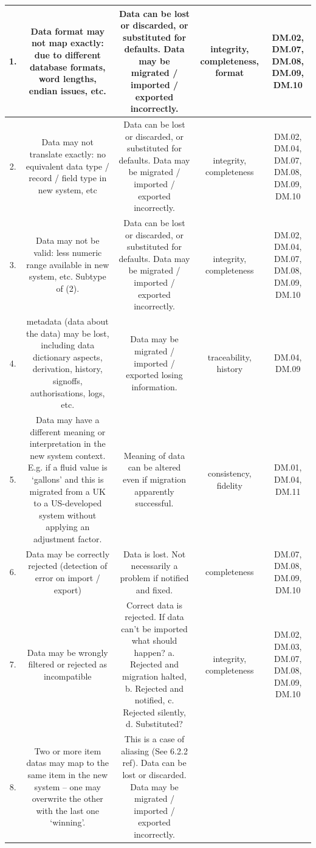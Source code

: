 \begin{longtable}{|C{}|C{}|C{}|C{}|C{}|}
1.&
Data format may not map exactly: due to different \gls{database} formats, word lengths, endian issues, etc.&
Data can be lost or discarded, or substituted for defaults. Data may be migrated / imported / exported incorrectly.&
\Gls{integrity}, \gls{completeness}, \gls{format}&
DM.02, DM.07, DM.08, DM.09, DM.10\\\hline
%
2.&
Data may not translate exactly: no equivalent data type / record / field type in new system, etc&
Data can be lost or discarded, or substituted for defaults. Data may be migrated / imported / exported incorrectly.&
\Gls{integrity}, \gls{completeness}&
DM.02, DM.04, DM.07, DM.08, DM.09, DM.10\\\hline
%
3.&
Data may not be valid: less numeric range available in new system, etc. Subtype of (2).&
Data can be lost or discarded, or substituted for defaults. Data may be migrated / imported / exported incorrectly.&
\Gls{integrity}, \gls{completeness}&
DM.02, DM.04, DM.07, DM.08, DM.09, DM.10\\\hline
%
4.&
\Gls{metadata} (data about the data) may be lost, including \gls{data dictionary} aspects, derivation, history, signoffs, authorisations,
logs, etc.&
Data may be migrated / imported / exported losing \gls{information}.&
\Gls{traceability}, \gls{history}&
DM.04, DM.09\\\hline
%
5.&
Data may have a different meaning or interpretation in the new system context.
E.g. if a fluid value is ‘gallons’ and this is migrated from a UK to a US-developed system without applying an adjustment factor.&
Meaning of data can be altered even if migration apparently successful.&
\Gls{consistency}, \gls{fidelity}&
DM.01, DM.04, DM.11\\\hline
%
6.
&
Data may be correctly rejected (detection of error on import / export)&
Data is lost. Not necessarily a problem if notified and fixed.&
\Gls{completeness}&
DM.07, DM.08, DM.09, DM.10\\\hline
%
7.
&
Data may be wrongly filtered or rejected as incompatible&
Correct data is rejected. If data can’t be imported what should happen? a. Rejected and migration halted,
b. Rejected and notified, c. Rejected silently, d. Substituted?&
\Gls{integrity}, \gls{completeness}&
DM.02, DM.03, DM.07, DM.08, DM.09, DM.10\\\hline
%
8.&
Two or more \glspl{item data} may map to the same item in the new system – one may overwrite the other with the last one ‘winning’.&
This is a case of aliasing (See 6.2.2 ref). Data can be lost or discarded. Data may be migrated / imported / exported incorrectly.&

\end{longtable}
